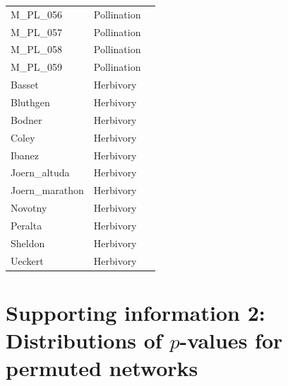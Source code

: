 \documentclass[12pt]{article}
\begin{document}
\begin{spacing}{1.0}
\begin{table}[h!]
\begin{center}
\begin{tabular}{|l l m{6cm} |}
    M\_PL\_056  & Pollination & \citep{Kato1993}  \\
    M\_PL\_057  & Pollination & \citep{Inoue1990} \\
    M\_PL\_058  & Pollination & \citep{Bartomeus2008} \\
    M\_PL\_059  & Pollination & \citep{Bezerra2009} \\
    Basset  & Herbivory & \citep{Basset1999}  \\
    Bluthgen  & Herbivory & \citep{Bluthgen2006}  \\
    Bodner  & Herbivory & \citep{Bodner2010}  \\
    Coley & Herbivory & \citep{Coley2006} \\
    Ibanez  & Herbivory & \citep{Ibanez2013}  \\
    Joern\_altuda  & Herbivory & \citep{Joern1979} \\
    Joern\_marathon  & Herbivory & \citep{Joern1979} \\
    Novotny & Herbivory & \citep{Novotny2012} \\
    Peralta & Herbivory & \citep{Peralta2015} \\
    Sheldon & Herbivory & \citep{Sheldon1978} \\
    Ueckert & Herbivory & \citep{Ueckert1971} \\
    \hline
    \end{tabular}
    \end{center}
    \end{table}
\clearpage
\newpage

\section*{Supporting information 2: Distributions of $p$-values for permuted networks}



\end{spacing}
\end{document}
